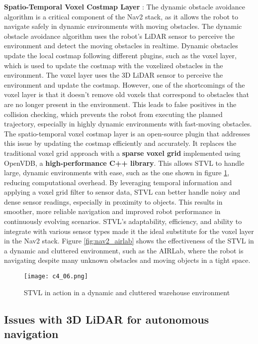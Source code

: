 \textbf{Spatio-Temporal Voxel Costmap Layer} \cite{macenski2020stvl}:
The dynamic obstacle avoidance algorithm is a critical component of the Nav2 stack, as it allows the robot to navigate
safely in dynamic environments with moving obstacles. The dynamic obstacle avoidance algorithm uses the robot's LiDAR sensor
to perceive the environment and detect the moving obstacles in realtime. Dynamic obstacles update the local costmap
following different plugins, such as the voxel layer, which is used to update the costmap with the voxelized obstacles
in the environment. The voxel layer uses the 3D LiDAR sensor to perceive the environment and update the costmap.
However, one of the shortcomings of the voxel layer is that it doesn't remove old voxels that correspond to obstacles
that are no longer present in the environment. This leads to false positives in the collision checking, which prevents
the robot from executing the planned trajectory, especially in highly dynamic environments with fast-moving obstacles.
The spatio-temporal voxel costmap layer is an open-source plugin that addresses this issue by updating the costmap
efficiently and accurately. It replaces the traditional voxel grid approach with a \textbf{sparse voxel grid} implemented
using OpenVDB, a \textbf{high-performance C++ library}. This allows STVL to handle large, dynamic environments with ease,
such as the one shown in figure \ref{fig:stvl}, 
reducing computational overhead. By leveraging temporal information and applying a voxel grid filter to sensor data,
STVL can better handle noisy and dense sensor readings, especially in proximity to objects. 
This results in smoother, more reliable navigation and improved robot performance in continuously evolving scenarios.
STVL's adaptability, efficiency, and ability to integrate with various sensor types made it the ideal substitute
for the voxel layer in the Nav2 stack. Figure \ref{fig:nav2_airlab} shows the effectiveness of the STVL in a dynamic
and cluttered environment, such as the AIRLab, where the robot is navigating despite many unknown obstacles 
and moving objects in a tight space.

\begin{figure}[t]
    \centering
    \texttt{[image: c4\_06.png]}
    \caption{STVL in action in a dynamic and cluttered warehouse environment}
    \label{fig:stvl}
\end{figure}


\subsection{Issues with 3D LiDAR for autonomous navigation}

